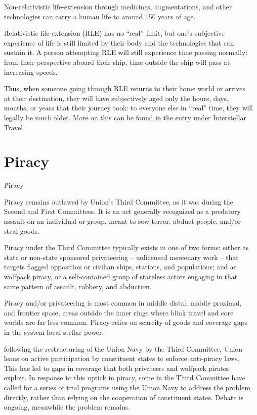 Non-relativistic life-extension through medicines, augmentations, and other technologies can
carry a human life to around 150 years of age.


Relativistic life-extension (RLE) has no “real” limit, but one’s subjective experience of life is still
limited by their body and the technologies that can sustain it. A person attempting RLE will still
experience time passing normally: from their perspective aboard their ship, time outside the ship
will pass at increasing speeds.





Thus, when someone going through RLE returns to their home world or arrives at their
destination, they will have subjectively aged only the hours, days, months, or years that their
journey took: to everyone else in “real” time, they will legally be much older. More on this can be
found in the entry under Interstellar Travel.

\section{Piracy}
Piracy

Piracy remains outlawed by Union’s Third Committee, as it was during the Second and First
Committees. It is an act generally recognized as a predatory assault on an individual or group,
meant to sow terror, abduct people, and/or steal goods.


Piracy under the Third Committee typically exists in one of two forms: either as state or non-state
sponsored privateering -- unlicensed mercenary work -- that targets flagged opposition or
civilian ships, stations, and populations; and as wolfpack piracy, or a self-contained group of
stateless actors engaging in that same pattern of assault, robbery, and abduction.


Piracy and/or privateering is most common in middle distal, middle proximal, and frontier space,
areas outside the inner rings where blink travel and core worlds are far less common. Piracy
relies on scarcity of goods and coverage gaps in the system-local stellar power;

following the restructuring of the Union Navy by the Third Committee, Union leans on active
participation by constituent states to enforce anti-piracy laws. This has led to gaps in coverage
that both privateers and wolfpack pirates exploit. In response to this uptick in piracy, some in the
Third Committee have called for a series of trial programs using the Union Navy to address the
problem directly, rather than relying on the cooperation of constituent states. Debate is ongoing,
meanwhile the problem remains.


